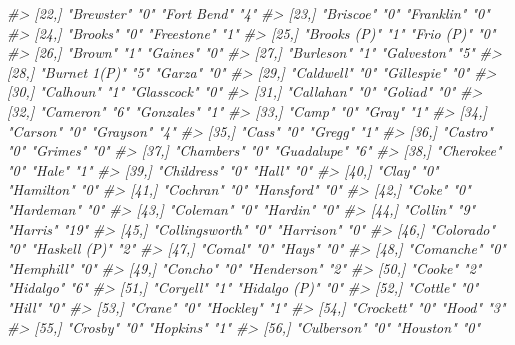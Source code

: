 \documentclass[
]{krantz}
\makeatletter
\newenvironment{Shaded}{\begin{snugshade}}{\end{snugshade}}
\newcommand{\CommentTok}[1]{\textcolor[rgb]{0.37,0.37,0.37}{\textit{#1}}}
\newenvironment{kframe}{%
\medskip{}
\setlength{\fboxsep}{.8em}
 \def\at@end@of@kframe{}%
 \ifinner\ifhmode%
  \def\at@end@of@kframe{\end{minipage}}%
  \begin{minipage}{\columnwidth}%
 \fi\fi%
 \def\FrameCommand##1{\hskip\@totalleftmargin \hskip-\fboxsep
 \colorbox{shadecolor}{##1}\hskip-\fboxsep
     \hskip-\linewidth \hskip-\@totalleftmargin \hskip\columnwidth}%
 \MakeFramed {\advance\hsize-\width
   \@totalleftmargin\z@ \linewidth\hsize
   \@setminipage}}%
 {\par\unskip\endMakeFramed%
 \at@end@of@kframe}
\renewenvironment{Shaded}{\begin{kframe}}{\end{kframe}}
\makeatother
\begin{document}
\begin{Shaded}
\begin{Highlighting}[]
\CommentTok{\#\textgreater{} [22,] "Brewster"      "0"  "Fort Bend"   "4" }
\CommentTok{\#\textgreater{} [23,] "Briscoe"       "0"  "Franklin"    "0" }
\CommentTok{\#\textgreater{} [24,] "Brooks"        "0"  "Freestone"   "1" }
\CommentTok{\#\textgreater{} [25,] "Brooks (P)"    "1"  "Frio (P)"    "0" }
\CommentTok{\#\textgreater{} [26,] "Brown"         "1"  "Gaines"      "0" }
\CommentTok{\#\textgreater{} [27,] "Burleson"      "1"  "Galveston"   "5" }
\CommentTok{\#\textgreater{} [28,] "Burnet 1(P)"   "5"  "Garza"       "0" }
\CommentTok{\#\textgreater{} [29,] "Caldwell"      "0"  "Gillespie"   "0" }
\CommentTok{\#\textgreater{} [30,] "Calhoun"       "1"  "Glasscock"   "0" }
\CommentTok{\#\textgreater{} [31,] "Callahan"      "0"  "Goliad"      "0" }
\CommentTok{\#\textgreater{} [32,] "Cameron"       "6"  "Gonzales"    "1" }
\CommentTok{\#\textgreater{} [33,] "Camp"          "0"  "Gray"        "1" }
\CommentTok{\#\textgreater{} [34,] "Carson"        "0"  "Grayson"     "4" }
\CommentTok{\#\textgreater{} [35,] "Cass"          "0"  "Gregg"       "1" }
\CommentTok{\#\textgreater{} [36,] "Castro"        "0"  "Grimes"      "0" }
\CommentTok{\#\textgreater{} [37,] "Chambers"      "0"  "Guadalupe"   "6" }
\CommentTok{\#\textgreater{} [38,] "Cherokee"      "0"  "Hale"        "1" }
\CommentTok{\#\textgreater{} [39,] "Childress"     "0"  "Hall"        "0" }
\CommentTok{\#\textgreater{} [40,] "Clay"          "0"  "Hamilton"    "0" }
\CommentTok{\#\textgreater{} [41,] "Cochran"       "0"  "Hansford"    "0" }
\CommentTok{\#\textgreater{} [42,] "Coke"          "0"  "Hardeman"    "0" }
\CommentTok{\#\textgreater{} [43,] "Coleman"       "0"  "Hardin"      "0" }
\CommentTok{\#\textgreater{} [44,] "Collin"        "9"  "Harris"      "19"}
\CommentTok{\#\textgreater{} [45,] "Collingsworth" "0"  "Harrison"    "0" }
\CommentTok{\#\textgreater{} [46,] "Colorado"      "0"  "Haskell (P)" "2" }
\CommentTok{\#\textgreater{} [47,] "Comal"         "0"  "Hays"        "0" }
\CommentTok{\#\textgreater{} [48,] "Comanche"      "0"  "Hemphill"    "0" }
\CommentTok{\#\textgreater{} [49,] "Concho"        "0"  "Henderson"   "2" }
\CommentTok{\#\textgreater{} [50,] "Cooke"         "2"  "Hidalgo"     "6" }
\CommentTok{\#\textgreater{} [51,] "Coryell"       "1"  "Hidalgo (P)" "0" }
\CommentTok{\#\textgreater{} [52,] "Cottle"        "0"  "Hill"        "0" }
\CommentTok{\#\textgreater{} [53,] "Crane"         "0"  "Hockley"     "1" }
\CommentTok{\#\textgreater{} [54,] "Crockett"      "0"  "Hood"        "3" }
\CommentTok{\#\textgreater{} [55,] "Crosby"        "0"  "Hopkins"     "1" }
\CommentTok{\#\textgreater{} [56,] "Culberson"     "0"  "Houston"     "0" }

\end{Highlighting}
\end{Shaded}
\end{document}
